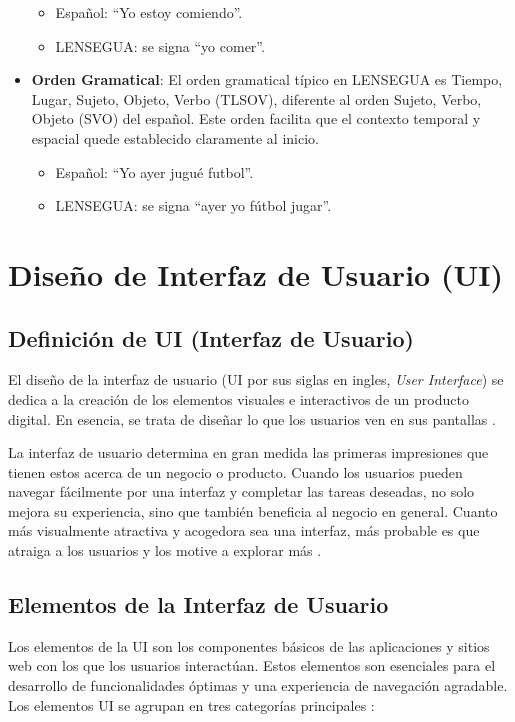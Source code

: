 \begin{itemize}
\begin{itemize}
        \item Español: ``Yo estoy comiendo''.
        \item LENSEGUA: se signa ``yo comer''.
    \end{itemize}
    \item \textbf{Orden Gramatical}: El orden gramatical típico en LENSEGUA es Tiempo, Lugar, Sujeto, Objeto, Verbo (TLSOV), diferente al orden Sujeto, Verbo, Objeto (SVO) del español. Este orden facilita que el contexto temporal y espacial quede establecido claramente al inicio.
    \begin{itemize}
        \item Español: ``Yo ayer jugué futbol''.
        \item LENSEGUA: se signa ``ayer yo fútbol jugar''.
    \end{itemize}
\end{itemize}

\section{Diseño de Interfaz de Usuario (UI)}
\subsection{Definición de UI (Interfaz de Usuario)}
El diseño de la interfaz de usuario (UI por sus siglas en ingles, \textit{User Interface}) se dedica a la creación de los elementos visuales e interactivos de un producto digital. En esencia, se trata de diseñar lo que los usuarios ven en sus pantallas \cite{OrtegaSF}.

La interfaz de usuario determina en gran medida las primeras impresiones que tienen estos acerca de un negocio o producto. Cuando los usuarios pueden navegar fácilmente por una interfaz y completar las tareas deseadas, no solo mejora su experiencia, sino que también beneficia al negocio en general. Cuanto más visualmente atractiva y acogedora sea una interfaz, más probable es que atraiga a los usuarios y los motive a explorar más \cite{OrtegaSF}.

\subsection{Elementos de la Interfaz de Usuario}
Los elementos de la UI son los componentes básicos de las aplicaciones y sitios web con los que los usuarios interactúan. Estos elementos son esenciales para el desarrollo de funcionalidades óptimas y una experiencia de navegación agradable. Los elementos UI se agrupan en tres categorías principales \cite{OrtegaSF}:

